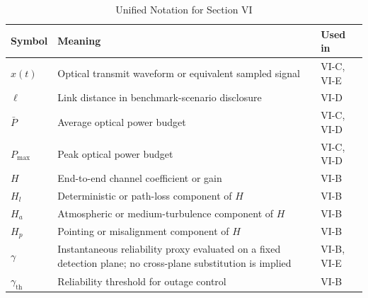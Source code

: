 \begin{table}[!t]
    \caption{Unified Notation for Section VI}
    \label{tab:section6_notation}
    \centering
    \footnotesize
    \begin{tabularx}{\columnwidth}{@{}>{\raggedright\arraybackslash}p{1.85cm}>{\raggedright\arraybackslash}X>{\raggedright\arraybackslash}p{1.55cm}@{}}
        \toprule
        \textbf{Symbol}      & \textbf{Meaning}                                                                                             & \textbf{Used in}       \\
        \midrule
        $x(t)$               & Optical transmit waveform or equivalent sampled signal                                                       & VI-C, VI-E             \\
        $\ell$               & Link distance in benchmark-scenario disclosure                                                               & VI-D                   \\
        $\bar P$             & Average optical power budget                                                                                 & VI-C, VI-D             \\
        $P_{\max}$           & Peak optical power budget                                                                                    & VI-C, VI-D             \\
        $H$                  & End-to-end channel coefficient or gain                                                                       & VI-B                   \\
        $H_l$                & Deterministic or path-loss component of $H$                                                                  & VI-B                   \\
        $H_a$                & Atmospheric or medium-turbulence component of $H$                                                            & VI-B                   \\
        $H_p$                & Pointing or misalignment component of $H$                                                                    & VI-B                   \\
        $\gamma$             & Instantaneous reliability proxy evaluated on a fixed detection plane; no cross-plane substitution is implied & VI-B, VI-E             \\
        $\gamma_{\text{th}}$ & Reliability threshold for outage control                                                                     & VI-B                   \\

\end{tabularx}
\end{table}
